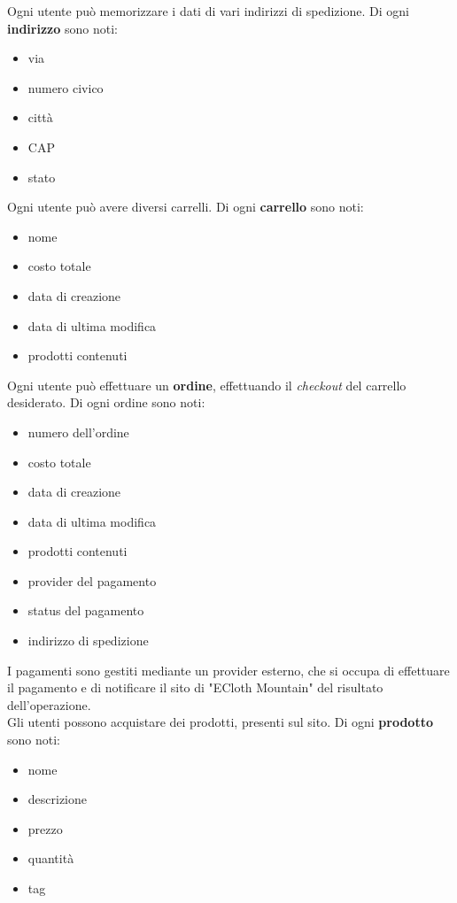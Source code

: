 \documentclass[11pt]{article}
\begin{document}
Ogni utente può memorizzare i dati di vari indirizzi di spedizione. Di ogni
\textbf{indirizzo} sono noti:

\begin{itemize}
	\item via
	\item numero civico
	\item città
	\item CAP
	\item stato
\end{itemize}

Ogni utente può avere diversi carrelli. Di ogni \textbf{carrello} sono noti:

\begin{itemize}
	\item nome
	\item costo totale
	\item data di creazione
	\item data di ultima modifica
	\item prodotti contenuti
\end{itemize}

Ogni utente può effettuare un \textbf{ordine}, effettuando il \textit{checkout}
del carrello desiderato. Di ogni ordine sono noti:

\begin{itemize}
	\item numero dell'ordine
	\item costo totale
	\item data di creazione
	\item data di ultima modifica
	\item prodotti contenuti
	\item provider del pagamento
	\item status del pagamento
	\item indirizzo di spedizione
\end{itemize}

I pagamenti sono gestiti mediante un provider esterno, che si occupa di
effettuare il pagamento e di notificare il sito di "ECloth Mountain" del
risultato dell'operazione. \\
Gli utenti possono acquistare dei prodotti, presenti sul sito. Di ogni
\textbf{prodotto} sono noti:

\begin{itemize}
	\item nome
	\item descrizione
	\item prezzo
	\item quantità
	\item tag
\end{itemize}
\end{document}
